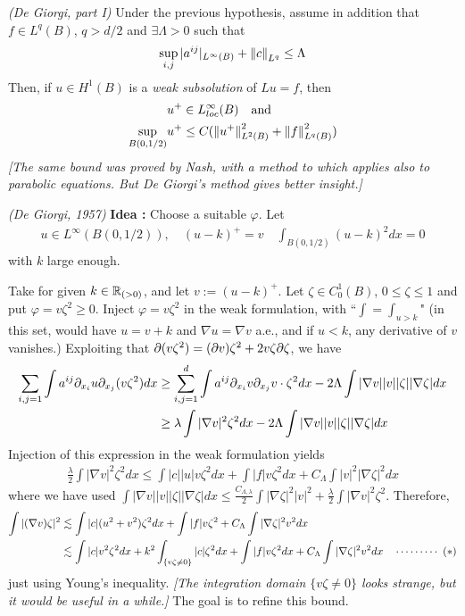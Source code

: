 \documentclass[12pt,a4paper]{article}
\newenvironment{proof}
{\begin{changemargin}{0.5cm}{0.5cm} 
	}%
	{\end{changemargin}
}
\newenvironment{p}
{\begin{proof} 
	}%
	{\end{proof}
}
\begin{document}
\thm \emph{(De Giorgi, part I)} Under the previous hypothesis, assume in addition that $f\in L^q(B)$, $q> d/2$ and $\exists \Lambda >0$ such that
\begin{align*}
\sup_{i,j} |a^{ij}|_{L^{\infty}(B)} + \snorms{c}{L^q} \leq \Lambda
\end{align*}
Then, if $u \in H^1(B)$ is a \emph{weak subsolution} of $Lu =f$, then
\begin{align*}
& u^+ \in L^{\infty}_{loc}(B) \quad \text{and}\\
\sup_{B(0, 1/2)} & u^+ \leq C(\snorms{u^+}{L^2(B)}^2 + \snorms{f}{L^q(B)}^2)
\end{align*}
\emph{[The same bound was proved by Nash, with a method to which applies also to parabolic equations. But De Giorgi's method gives better insight.]} 
\begin{p}
\pf \emph{(De Giorgi, 1957)} \textbf{Idea :} Choose a suitable $\varphi$. Let
\begin{align*}
u\in L^{\infty}(B(0,1/2)), \quad (u-k)^+ = v \quad \int_{B(0, 1/2)}(u-k)^2 dx = 0
\end{align*}
with $k$ large enough.
\s

Take for given $k \in \mathbb{R}_{(>0)}$, and let $v:= (u-k)^+$. Let $\zeta \in C_0^1(B)$, $0\leq \zeta \leq 1$ and put $\varphi = v\zeta^2 \geq 0$. Inject $\varphi = v\zeta^2$ in the weak formulation, with ``$\int = \int_{u>k}$" (in this set, would have $u=v +k$ and $\nabla u = \nabla v$ a.e., and if $u<k$, any derivative of $v$ vanishes.) Exploiting that $\partial (v\zeta^2) = (\partial v) \zeta^2 + 2v\zeta \partial \zeta$, we have
\begin{align*}
\sum_{i,j=1} \int a^{ij} \partial_{x_i} u \partial_{x_j}(v\zeta^2) dx & \geq \sum_{i,j=1}^d \int a^{ij} \partial_{x_i} v \partial_{x_j} v \cdot \zeta^2 dx - 2\Lambda \int |\nabla v| |v| |\zeta| |\nabla \zeta| dx \\
& \geq \lambda \int |\nabla v|^2 \zeta^2 dx - 2\Lambda \int |\nabla v| |v| |\zeta| |\nabla \zeta| dx
\end{align*} 
Injection of this expression in the weak formulation yields
\begin{align*}
\frac{\lambda}{2} \int |\nabla v|^2 \zeta^2 dx \leq \int |c||u|v\zeta^2 dx + \int |f| v\zeta^2 dx + C_{\Lambda} \int |v|^2 |\nabla \zeta|^2 dx 
\end{align*}
where we have used $\int |\nabla v||v||\zeta||\nabla \zeta| dx \leq \frac{C_{\Lambda, \lambda}}{2} \int |\nabla \zeta|^2 |v|^2 + \frac{\lambda}{2} \int |\nabla v|^2 \zeta^2$. Therefore,
\begin{align*}
\int |(\nabla v) \zeta|^2 & \lesssim \int |c|(u^2+v^2) \zeta^2 dx + \int |f| v\zeta^2 + C_{\Lambda} \int |\nabla \zeta|^2 v^2 dx  \\
& \lesssim \int |c|v^2 \zeta^2 dx + k^2 \int_{\{v\zeta \neq 0\}} |c|\zeta^2 dx + \int |f| v\zeta^2 dx + C_{\Lambda} \int |\nabla \zeta|^2 v^2 dx \quad \cdots\cdots\cdots\,\,(*)
\end{align*}
just using Young's inequality. \emph{[The integration domain $\{v\zeta \neq 0\}$ looks strange, but it would be useful in a while.]} The goal is to refine this bound. 
\s


\end{p}
\end{document}
